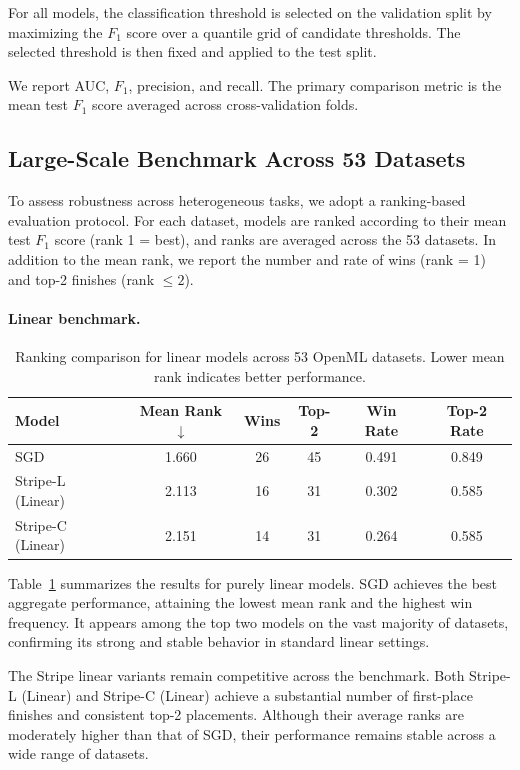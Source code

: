 \documentclass[a4paper,fleqn]{cas-sc}
\begin{document}
For all models, the classification threshold is selected on the validation split by maximizing the $F_1$ score over a quantile grid of candidate thresholds. 
The selected threshold is then fixed and applied to the test split.

We report AUC, $F_1$, precision, and recall. 
The primary comparison metric is the mean test $F_1$ score averaged across cross-validation folds.


\subsection{Large-Scale Benchmark Across 53 Datasets}

To assess robustness across heterogeneous tasks, we adopt a ranking-based evaluation protocol.
For each dataset, models are ranked according to their mean test $F_1$ score
(rank 1 = best), and ranks are averaged across the 53 datasets.
In addition to the mean rank, we report the number and rate of wins (rank = 1)
and top-2 finishes (rank $\le 2$).

\paragraph{Linear benchmark.}

\begin{table}[t]
\centering
\caption{Ranking comparison for linear models across 53 OpenML datasets.
Lower mean rank indicates better performance.}
\label{tab:rank_linear}
\begin{tabular}{lccccc}
\toprule
Model & Mean Rank $\downarrow$ & Wins & Top-2 & Win Rate & Top-2 Rate \\
\midrule
SGD & 1.660 & 26 & 45 & 0.491 & 0.849 \\
Stripe-L (Linear) & 2.113 & 16 & 31 & 0.302 & 0.585 \\
Stripe-C (Linear) & 2.151 & 14 & 31 & 0.264 & 0.585 \\
\bottomrule
\end{tabular}
\end{table}

Table~\ref{tab:rank_linear} summarizes the results for purely linear models.
SGD achieves the best aggregate performance, attaining the lowest mean rank and the highest win frequency.
It appears among the top two models on the vast majority of datasets, confirming its strong and stable behavior in standard linear settings.

The Stripe linear variants remain competitive across the benchmark.
Both Stripe-L (Linear) and Stripe-C (Linear) achieve a substantial number of first-place finishes and consistent top-2 placements.
Although their average ranks are moderately higher than that of SGD, their performance remains stable across a wide range of datasets.
\end{document}
